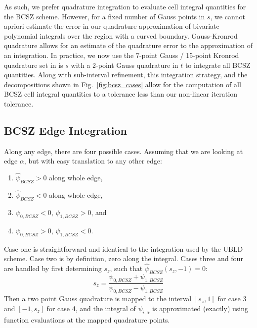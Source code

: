 \documentclass{mc2015}
\newcommand{\fig}[1]{Fig.~\ref{#1}}                      %
\newcommand{\benum}{\begin{equation}} 			%
\newcommand{\eenum}{\end{equation}}
\newcommand{\BCSZH}{\ensuremath{\widehat{\psi}_{BCSZ}}}
\begin{document}
As such, we prefer quadrature integration to evaluate cell integral quantities for the BCSZ scheme.
However, for a fixed number of Gauss points in $s$, we cannot apriori estimate the error in our quadrature approximation of bivariate polynomial integrals over the region with a curved boundary.
Gauss-Kronrod quadrature \cite{gk_quad} allows for an estimate of the quadrature error to the approximation of an integration.
In practice, we now use the 7-point Gauss / 15-point Kronrod quadrature set in is $s$ with a 2-point Gauss quadrature in $t$ to integrate all BCSZ quantities.
Along with sub-interval refinement, this integration strategy, and the decompositions shown in \fig{fig:bcsz_cases} allow for the computation of all BCSZ cell integral quantities to a tolerance less than our non-linear iteration tolerance.

\subsection{BCSZ Edge Integration}
Along any edge, there are four possible cases.  Assuming that we are looking at edge $\alpha$, but with easy translation to any other edge:
\begin{enumerate}
\item $\BCSZH > 0$ along whole edge,
\item  $\BCSZH < 0$ along whole edge,
\item $\psi_{0,BCSZ} < 0$, $\psi_{1,BCSZ} > 0$, and
\item $\psi_{0,BCSZ} > 0$, $\psi_{1,BCSZ} <0$.
\end{enumerate}
Case one is straightforward and identical to the integration used by the UBLD scheme. 
Case two is by definition, zero along the integral.
Cases three and four are handled by first determining $s_z$, such that $\BCSZH(s_z,-1) = 0$:
\benum
s_z = \frac{\psi_{0,BCSZ}+\psi_{1,BCSZ}}{\psi_{0,BCSZ} - \psi_{1,BCSZ} }
\eenum
Then a two point Gauss quadrature is mapped to the interval $[s_z,1]$ for case 3 and $[-1,s_z]$ for case 4, and the integral of $\psi_{i,\alpha}$
is approximated (exactly) using function evaluations at the mapped quadrature points.
\end{document}
